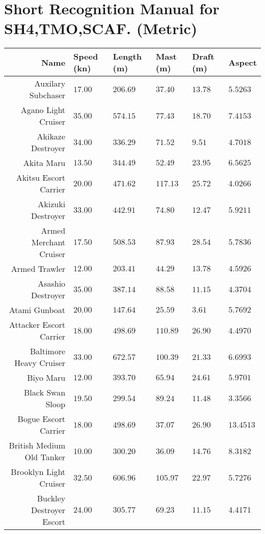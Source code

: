 \documentclass{article}
\begin{document}
\section*{Short Recognition Manual for SH4,TMO,SCAF. (Metric)}
\centering
\begin{tabularx}{\textwidth}{|r|l|l|l|l|X|}
\hline
\textbf{Name} & \textbf{Speed (kn)} & \textbf{Length (m)} & \textbf{Mast (m)} & \textbf{Draft (m)} & \textbf{Aspect}\\
\hline
 Auxilary Subchaser & $17.00$ & $206.69$ & $37.40$ & $13.78$ & $5.5263$ \\
\hline
Agano Light Cruiser & $35.00$ & $574.15$ & $77.43$ & $18.70$ & $7.4153$ \\
\hline
Akikaze Destroyer & $34.00$ & $336.29$ & $71.52$ & $9.51$ & $4.7018$ \\
\hline
Akita Maru & $13.50$ & $344.49$ & $52.49$ & $23.95$ & $6.5625$ \\
\hline
Akitsu Escort Carrier & $20.00$ & $471.62$ & $117.13$ & $25.72$ & $4.0266$ \\
\hline
Akizuki Destroyer & $33.00$ & $442.91$ & $74.80$ & $12.47$ & $5.9211$ \\
\hline
Armed Merchant Cruiser & $17.50$ & $508.53$ & $87.93$ & $28.54$ & $5.7836$ \\
\hline
Armed Trawler & $12.00$ & $203.41$ & $44.29$ & $13.78$ & $4.5926$ \\
\hline
Asashio Destroyer & $35.00$ & $387.14$ & $88.58$ & $11.15$ & $4.3704$ \\
\hline
Atami Gunboat & $20.00$ & $147.64$ & $25.59$ & $3.61$ & $5.7692$ \\
\hline
Attacker Escort Carrier & $18.00$ & $498.69$ & $110.89$ & $26.90$ & $4.4970$ \\
\hline
Baltimore Heavy Cruiser & $33.00$ & $672.57$ & $100.39$ & $21.33$ & $6.6993$ \\
\hline
Biyo Maru & $12.00$ & $393.70$ & $65.94$ & $24.61$ & $5.9701$ \\
\hline
Black Swan Sloop & $19.50$ & $299.54$ & $89.24$ & $11.48$ & $3.3566$ \\
\hline
Bogue Escort Carrier & $18.00$ & $498.69$ & $37.07$ & $26.90$ & $13.4513$ \\
\hline
British Medium Old Tanker & $10.00$ & $300.20$ & $36.09$ & $14.76$ & $8.3182$ \\
\hline
Brooklyn Light Cruiser & $32.50$ & $606.96$ & $105.97$ & $22.97$ & $5.7276$ \\
\hline
Buckley Destroyer Escort & $24.00$ & $305.77$ & $69.23$ & $11.15$ & $4.4171$ \\

\end{tabularx}
\end{document}
